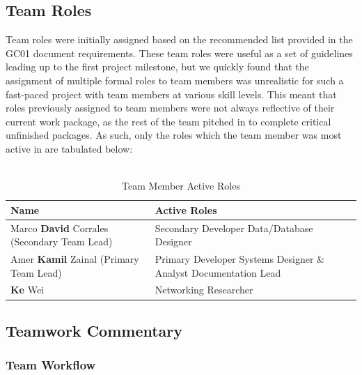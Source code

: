\documentclass[12pt,a4paper,oneside,titlepage]{article}
\begin{document}
\subsection{Team Roles}
Team roles were initially assigned based on the recommended list provided in the GC01 document requirements. These team roles were useful as a set of guidelines leading up to the first project milestone, but we quickly found that the assignment of multiple formal roles to team members was unrealistic for such a fast-paced project with team members at various skill levels. This meant that roles previously assigned to team members were not always reflective of their current work package, as the rest of the team pitched in to complete critical unfinished packages. As such, only the roles which the team member was most active in are tabulated below:
\\ \\
\begin{table}[h]
\centering
    \begin{tabular}{ | p{5cm} | p{5.4cm} |}
    \hline
    Name & Active Roles \\ \hline
    Marco \textbf{David} Corrales \newline (Secondary Team Lead) & Secondary Developer \newline Data/Database Designer \newline \\ \hline
     Amer \textbf{Kamil} Zainal \newline (Primary Team Lead)  & Primary Developer \newline Systems Designer \& Analyst \newline Documentation Lead \newline \\ \hline
     \textbf{Ke} Wei & Networking Researcher \newline \\ \hline
    \end{tabular}
    \caption{Team Member Active Roles}
    \end{table}

\newpage
\subsection{Teamwork Commentary}
\subsubsection{Team Workflow}
\end{document}
